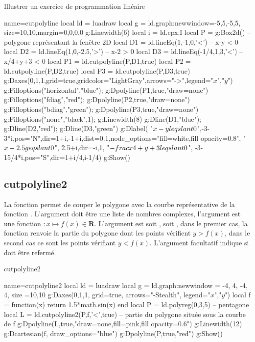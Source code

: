 \begin{demo}{Illustrer un exercice de programmation linéaire}
\begin{luadraw}{name=cutpolyline}
local ld = luadraw
local g = ld.graph:new{window={-5,5,-5,5}, size={10,10},margin={0,0,0,0}}
g:Linewidth(6)
local i = ld.cpx.I
local P = g:Box2d() -- polygone représentant la fenêtre 2D
local D1 = ld.lineEq(1,-1,0,'<')    -- x-y < 0
local D2 = ld.lineEq(1,0,-2.5,'>')  -- x-2 > 0
local D3 = ld.lineEq(-1/4,1,3,'<')  -- x/4+y+3 < 0
local P1 = ld.cutpolyline(P,D1,true)
local P2 = ld.cutpolyline(P,D2,true)
local P3 = ld.cutpolyline(P,D3,true)
g:Daxes({0,1,1},{grid=true,gridcolor="LightGray",arrows="->",legend={"$x$","$y$"}})
g:Filloptions("horizontal","blue"); g:Dpolyline(P1,true,"draw=none")
g:Filloptions("fdiag","red"); g:Dpolyline(P2,true,"draw=none")
g:Filloptions("bdiag","green"); g:Dpolyline(P3,true,"draw=none")
g:Filloptions("none","black",1); g:Linewidth(8)
g:Dline(D1,"blue"); g:Dline(D2,"red"); g:Dline(D3,"green")
g:Dlabel(
"$x-y\\leqslant 0$",-3-3*i,{pos="N",dir={1+i,-1+i},dist=0.1,node_options="fill=white,fill opacity=0.8"},
"$x-2.5\\geqslant0$", 2.5+i,{dir={-i,1}},
"$-\\frac{x}{4}+y+3\\leqslant0$", -3-15/4*i,{pos="S",dir={1+i/4,i-1/4}})
g:Show()
\end{luadraw}
\end{demo}

\subsection{cutpolyline2}

La fonction  permet de couper le polygone  avec la courbe représentative de la fonction . L'argument  doit être une liste de nombres complexes, l'argument  est une fonction $\colon x \mapsto f(x)\in \mathbf R$. L'argument  est soit , soit , dans le premier cas, la fonction renvoie la partie du polygone  dont les points vérifient $y>f(x)$, dans le second cas ce sont les points vérifiant $y<f(x)$. L'argument facultatif  indique si  doit être refermé. 

\begin{demo}{cutpolyline2}
\begin{luadraw}{name=cutpolyline2}
local ld = luadraw
local g = ld.graph:new{window = {-4, 4, -4, 4}, size ={10,10}}
g:Daxes({0,1,1}, {grid=true, arrows="-Stealth", legend={"$x$","$y$"}})
local f = function(x) return 1.5*math.sin(x) end
local P = ld.polyreg(0,3,5) -- pentagone
local L = ld.cutpolyline2(P,f,'<',true) -- partie du polygone située sous la courbe de f
g:Dpolyline(L,true,"draw=none,fill=pink,fill opacity=0.6")
g:Linewidth(12)
g:Dcartesian(f, {draw_options="blue"})
g:Dpolyline(P,true,"red")
g:Show()
\end{luadraw}
\end{demo}

